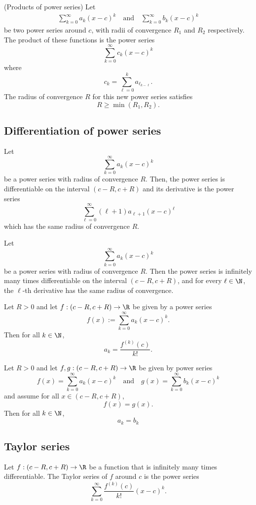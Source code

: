 \begin{proposition}(Products of power series)
    Let 
    \begin{align*}
        \sum_{k=0}^\infty a_k(x-c)^k \quad \text{and} \quad \sum_{k=0}^\infty b_k(x-c)^k
    \end{align*}
    be two power series around $c$, with radii of convergence $R_1$ and $R_2$
    respectively. The product of these functions is the power series
    $$\sum_{k=0}^\infty c_k(x-c)^k$$
    where
    $$c_k = \sum_{\ell=0}^k a_{\ell_{k-\ell}}.$$
    The radius of convergence $R$ for this new power series satisfies
    $$R \ge \min(R_1,R_2).$$
\end{proposition}

\subsection{Differentiation of power series}

\begin{proposition}
    Let
    $$\sum_{k=0}^\infty a_k(x-c)^k$$
    be a power series with radius of convergence $R$. Then, the power series
    is differentiable on the interval $(c-R,c+R)$ and its derivative is the power series
    $$\sum_{\ell=0}^\infty (\ell+1)a_{\ell+1}(x-c)^\ell$$
    which has the same radius of convergence $R$.
\end{proposition}

\begin{corollary}
    Let $$\sum_{k=0}^\infty a_k(x-c)^k$$ be a power series with radius of
    convergence $R$. Then the power series is infinitely many times
    differentiable on the interval $(c-R,c+R)$, and for every $\ell \in \N$,
    the $\ell$-th derivative has the same radius of convergence.
\end{corollary}

\begin{theorem}
    Let $R > 0$ and let $f:(c-R,c+R) \to \R$ be given by a power series
    $$f(x):= \sum_{k=0}^\infty a_k(x-c)^k.$$
    Then for all $k \in \N$,
    $$a_k = \frac{f^{(k)}(c)}{k!}.$$
\end{theorem}

\begin{theorem}
    Let $R>0$ and let $f, g:(c-R,c+R) \to \R$ be given by power series
    $$f(x) = \sum_{k=0}^\infty a_k(x-c)^k \quad \text{and} \quad g(x) = \sum_{k=0}^\infty b_k(x-c)^k$$
    and assume for all $x \in (c-R,c+R)$, 
    $$f(x) = g(x).$$
    Then for all $k \in \N$,
    $$a_k = b_k$$
\end{theorem}

\subsection{Taylor series}
\begin{definition}
    Let $f:(c-R,c+R) \to \R$ be a function that is infinitely many times
    differentiable. The Taylor series of $f$ around $c$ is the power series
    $$\sum_{k=0}^\infty \frac{f^{(k)}(c)}{k!}(x-c)^k.$$
\end{definition}
